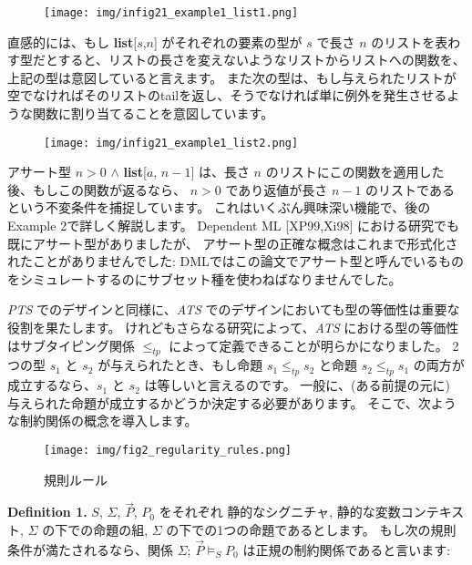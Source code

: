 \documentclass[submit,techreq,noauthor,onecolumn]{ipsj}
\begin{document}
\begin{figure}[h]
\centering
\texttt{[image: img/infig21\_example1\_list1.png]}
\end{figure}

\noindent 直感的には、もし {\bf list}[$s$,$n$] がそれぞれの要素の型が $s$ で長さ $n$ のリストを表わす型だとすると、リストの長さを変えないようなリストからリストへの関数を、上記の型は意図していると言えます。
また次の型は、もし与えられたリストが空でなければそのリストのtailを返し、そうでなければ単に例外を発生させるような関数に割り当てることを意図しています。

\begin{figure}[h]
\centering
\texttt{[image: img/infig21\_example1\_list2.png]}
\end{figure}

アサート型 $n > 0$ $\wedge$ {\bf list}[$a$, $n-1$] は、長さ $n$ のリストにこの関数を適用した後、もしこの関数が返るなら、 $n > 0$ であり返値が長さ $n-1$ のリストであるという不変条件を捕捉しています。
これはいくぶん興味深い機能で、後のExample 2で詳しく解説します。
Dependent ML [XP99,Xi98] における研究でも既にアサート型がありましたが、
アサート型の正確な概念はこれまで形式化されたことがありませんでした:
DMLではこの論文でアサート型と呼んでいるものをシミュレートするのにサブセット種を使わねばなりませんでした。

{\it PTS} でのデザインと同様に、{\it ATS} でのデザインにおいても型の等価性は重要な役割を果たします。
けれどもさらなる研究によって、{\it ATS} における型の等価性はサブタイピング関係 $\leq_{tp}$ によって定義できることが明らかになりました。
2つの型 $s_1$ と $s_2$ が与えられたとき、もし命題 $s_1 \leq_{tp} s_2$ と命題 $s_2 \leq_{tp} s_1$ の両方が成立するなら、$s_1$ と $s_2$ は等しいと言えるのです。
一般に、(ある前提の元に) 与えられた命題が成立するかどうか決定する必要があります。
そこで、次ような制約関係の概念を導入します。

\begin{figure}[h]
\centering
\texttt{[image: img/fig2\_regularity\_rules.png]}
\caption{規則ルール}
\label{fig:fig2_regularity_rules}
\end{figure}

{\bf Definition 1.}
$S$, $\Sigma$, $\vec{P}$, $P_0$ をそれぞれ 静的なシグニチャ, 静的な変数コンテキスト, $\Sigma$ の下での命題の組, $\Sigma$ の下での1つの命題であるとします。
もし次の規則条件が満たされるなら、関係 $\Sigma$; $\vec{P} \models_S P_0$ は正規の制約関係であると言います:
\end{document}
